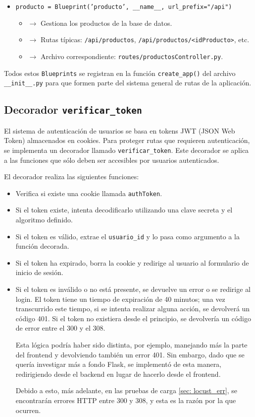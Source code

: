 \documentclass[10pt]{book}
\begin{document}
\begin{itemize}
    \item \texttt{producto = Blueprint('producto', \_\_name\_\_, url\_prefix="/api")}
    \begin{itemize}
        \item $\rightarrow$ Gestiona los productos de la base de datos.
        \item $\rightarrow$ Rutas típicas: \texttt{/api/productos}, \texttt{/api/productos/<idProducto>}, etc.
        \item $\rightarrow$ Archivo correspondiente: \texttt{routes/productosController.py}.
    \end{itemize}
\end{itemize}

Todos estos \texttt{Blueprints} se registran en la función \texttt{create\_app()} del archivo \texttt{\_\_init\_\_.py} para que formen parte del sistema general de rutas de la aplicación.

\subsection{Decorador \texttt{verificar\_token}} \label{sec:token}

El sistema de autenticación de usuarios se basa en tokens JWT (JSON Web Token) almacenados en cookies. Para proteger rutas que requieren autenticación, se implementa un decorador llamado \texttt{verificar\_token}. Este decorador se aplica a las funciones que sólo deben ser accesibles por usuarios autenticados.

El decorador realiza las siguientes funciones:

\begin{itemize}
    \item Verifica si existe una cookie llamada \texttt{authToken}.
    \item Si el token existe, intenta decodificarlo utilizando una clave secreta y el algoritmo definido.
    \item Si el token es válido, extrae el \texttt{usuario\_id} y lo pasa como argumento a la función decorada.
    \item Si el token ha expirado, borra la cookie y redirige al usuario al formulario de inicio de sesión.
    \item Si el token es inválido o no está presente, se devuelve un error o se redirige al login. El token tiene un tiempo de expiración de 40 minutos; una vez transcurrido este tiempo, si se intenta realizar alguna acción, se devolverá un código 401. Si el token no existiera desde el principio, se devolvería un código de error entre el 300 y el 308. 
    
    Esta lógica podría haber sido distinta, por ejemplo, manejando más la parte del frontend y devolviendo también un error 401. Sin embargo, dado que se quería investigar más a fondo Flask, se implementó de esta manera, redirigiendo desde el backend en lugar de hacerlo desde el frontend. 
    
    Debido a esto, más adelante, en las pruebas de carga \autoref{sec: locust_err}, se encontrarán errores HTTP entre 300 y 308, y esta es la razón por la que ocurren.
    
\end{itemize}
\end{document}
